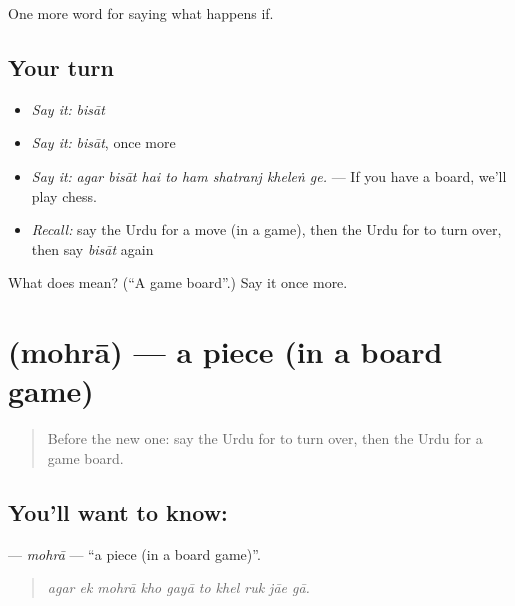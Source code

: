 \begin{grammarlens}[title={What you've built}]
One more word for saying what happens if.
\end{grammarlens}

\subsection*{Your turn}
\begin{itemize}
\raggedright
  \item \emph{Say it:} \emph{bisāt}
  \item \emph{Say it:} \emph{bisāt}, once more
  \item \emph{Say it:} \emph{agar bisāt hai to ham shatranj kheleṅ ge.} — If you have a board, we'll play chess.
  \item \emph{Recall:} say the Urdu for a move (in a game), then the Urdu for to turn over, then say \emph{bisāt} again
\end{itemize}

\begin{tcolorbox}[breakable,colback=teal!4,colframe=teal!35!black,title={Before you move on}]
What does  mean? (\textquotedblleft{}A game board\textquotedblright{}.) Say it once more.
\end{tcolorbox}
\section[\texorpdfstring{\ur{مہرہ} (mohrā)}{مہرہ (mohrā)}]{ (mohrā) — a piece (in a board game)}

\label{lesson:UR-C534-mohra}



\begin{quote}
Before the new one: say the Urdu for to turn over, then the Urdu for a game board.
\end{quote}

\subsection*{You'll want to know: }
\textbf{} — \emph{mohrā} — \textquotedblleft{}a piece (in a board game)\textquotedblright{}.

\begin{quote}
         
\end{quote}

\begin{quote}
\emph{agar ek mohrā kho gayā to khel ruk jāe gā.}
\end{quote}

